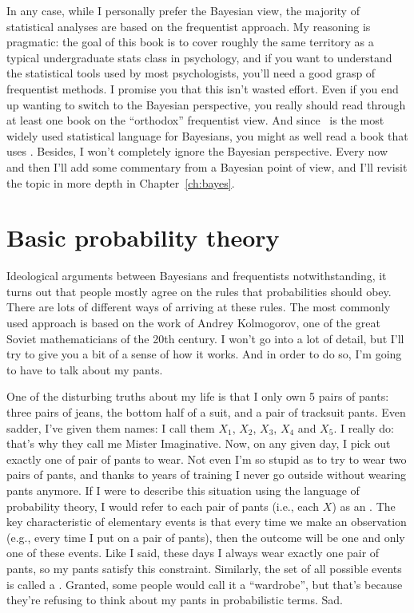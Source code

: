 In any case, while I personally prefer the Bayesian view, the majority of statistical analyses are based on the frequentist approach. My reasoning is pragmatic: the goal of this book is to cover roughly the same territory as a typical undergraduate stats class in psychology, and if you want to understand the statistical tools used by most psychologists, you'll need a good grasp of frequentist methods. I promise you that this isn't wasted effort. Even if you end up wanting to switch to the Bayesian perspective, you really should read through at least one book on the ``orthodox'' frequentist view. And since \R\ is the most widely used statistical language for Bayesians, you might as well read a book that uses \R. Besides, I won't completely ignore the Bayesian perspective. Every now and then I'll add some commentary from a Bayesian point of view, and I'll revisit the topic in more depth in Chapter~\ref{ch:bayes}.


 
 
 
\section{Basic probability theory~\label{sec:basicprobability}}

Ideological arguments between Bayesians and frequentists notwithstanding, it turns out that people mostly agree on the rules that probabilities should obey. There are lots of different ways of arriving at these rules. The most commonly used approach is based on the work of Andrey Kolmogorov, one of the great Soviet mathematicians of the 20th century. I won't go into a lot of detail, but I'll try to give you a bit of a sense of how it works. And in order to do so, I'm going to have to talk about my pants.


One of the disturbing truths about my life is that I only own 5 pairs of pants: three pairs of jeans, the bottom half of a suit, and a pair of tracksuit pants. Even sadder, I've given them names: I call them $X_1$, $X_2$, $X_3$, $X_4$ and $X_5$. I really do: that's why they call me Mister Imaginative. Now, on any given day, I pick out exactly one of pair of pants to wear. Not even I'm so stupid as to try to wear two pairs of pants, and thanks to years of training I never go outside without wearing pants anymore. If I were to describe this situation using the language of probability theory, I would refer to each pair of pants (i.e., each $X$) as an . The key characteristic of elementary events is that every time we make an observation (e.g., every time I put on a pair of pants), then the outcome will be one and only one of these events. Like I said, these days I always wear exactly one pair of pants, so my pants satisfy this constraint. Similarly, the set of all possible events is called a . Granted, some people would call it a ``wardrobe'', but that's because they're refusing to think about my pants in probabilistic terms. Sad.  

